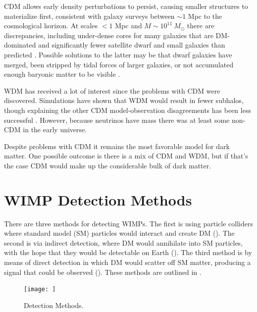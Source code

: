 CDM allows early density perturbations to persist, causing smaller structures to materialize first,
consistent with galaxy surveys between ${\sim} 1$ Mpc to the cosmological horizon.  At scales $< 1$ Mpc and
$M \sim 10^{11} \ M_{\odot}$ there are discrepancies, including under-dense cores for many galaxies that are DM-dominated
and significantly fewer satellite dwarf and small galaxies than predicted .  Possible
solutions to the latter may be that dwarf galaxies have merged, been stripped by tidal forces of larger galaxies, or
not accumulated enough baryonic matter to be visible .

WDM has received a lot of interest since the problems with CDM were discovered.  Simulations have shown that
WDM would result in fewer subhalos, though explaining the other CDM model-observation disagreements has been less
successful .  However, because neutrinos have mass there
was at least some non-CDM in the early universe.

Despite problems with CDM it remains the most favorable model for dark matter.  One possible outcome is
there is a mix of CDM and WDM, but if that's the case CDM would make up the considerable bulk of dark matter.


\section[WIMP Detection Methods][WIMP Detection Methods]{WIMP Detection Methods}
\label{sec:detection}

There are three methods for detecting WIMPs.  The first is using particle colliders where standard model (SM) particles would interact and
create DM ().  The second is via indirect detection, where DM would annihilate into SM particles, with the hope
that they would be detectable
on Earth ().  The third method is by means of direct detection in which DM would scatter off SM matter, producing
a signal that could be
observed ().  These methods are outlined in .

\begin{figure}
\centering
\texttt{[image: ]}
\caption{Detection Methods.}
\label{fig:detection_methods}
\end{figure}

